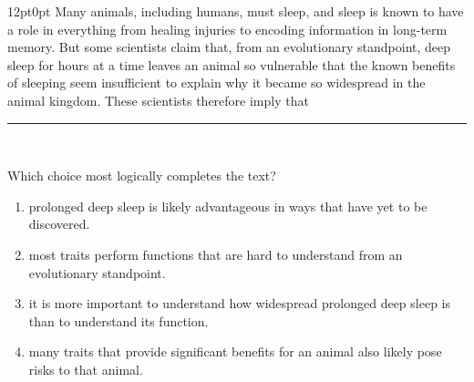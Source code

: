 \documentclass[11pt, twocolumn]{article}
\newcounter{questionnum}
\begin{document}
\vspace{6pt}\noindent
\begin{minipage}{\columnwidth}\raggedright
\noindent{}\par\vspace{8pt}
\begin{adjustwidth}{12pt}{0pt}
Many animals, including humans, must sleep, and sleep is known to have a role in everything from healing injuries to encoding information in long-term memory. But some scientists claim that, from an evolutionary standpoint, deep sleep for hours at a time leaves an animal so vulnerable that the known benefits of sleeping seem insufficient to explain why it became so widespread in the animal kingdom. These scientists therefore imply that \,\rule{2cm}{0.4pt}\,
\vspace{6pt}

Which choice most logically completes the text?
\begin{enumerate}[label=\Alph*),leftmargin=18pt,topsep=3pt,itemsep=2pt]
  \item prolonged deep sleep is likely advantageous in ways that have yet to be discovered.
  \item most traits perform functions that are hard to understand from an evolutionary standpoint.
  \item it is more important to understand how widespread prolonged deep sleep is than to understand its function.
  \item many traits that provide significant benefits for an animal also likely pose risks to that animal.
\end{enumerate}
\end{adjustwidth}
\end{minipage}\par
\end{document}
